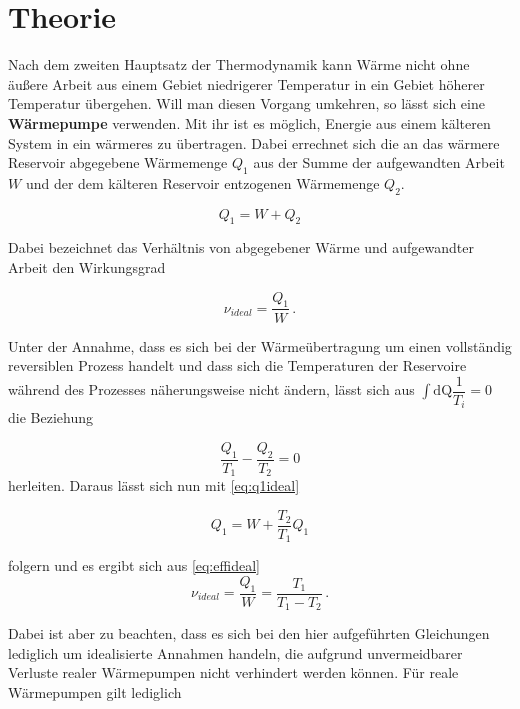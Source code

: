 \section{Theorie}
\label{sec:Theorie}
Nach dem zweiten Hauptsatz der Thermodynamik kann Wärme nicht ohne äußere Arbeit aus einem Gebiet niedrigerer Temperatur in ein Gebiet höherer Temperatur übergehen. Will man diesen Vorgang umkehren, so lässt sich
eine \textbf{Wärmepumpe} verwenden. Mit ihr ist es möglich, Energie aus einem kälteren System in ein wärmeres zu übertragen. Dabei errechnet sich die an das wärmere Reservoir abgegebene Wärmemenge $Q_1$ 
aus der Summe der aufgewandten Arbeit $W$ und der dem kälteren Reservoir entzogenen Wärmemenge $Q_2$.

\begin{equation}
    \label{eq:q1ideal}
    Q_1= W + Q_2
\end{equation}

Dabei bezeichnet das Verhältnis von abgegebener Wärme und aufgewandter Arbeit den Wirkungsgrad

\begin{equation}
    \label{eq:effideal}
    ν_{ideal} = \dfrac{Q_1}{W} \, \text{.}
\end{equation}

Unter der Annahme, dass es sich bei der Wärmeübertragung um einen vollständig reversiblen Prozess handelt und dass sich die Temperaturen der Reservoire während des Prozesses näherungsweise nicht ändern, lässt sich aus
$\int{\mathrm{dQ}\dfrac{1}{T_i}}=0$ die Beziehung

\begin{equation}
    \label{eq:rever}
    \dfrac{Q_1}{T_1} - \dfrac{Q_2}{T_2} = 0
\end{equation}
herleiten.
Daraus lässt sich nun mit \eqref{eq:q1ideal}

\begin{equation}
    Q_1 = W +\dfrac{T_2}{T_1}Q_1
\end{equation}
    
folgern und es ergibt sich aus \eqref{eq:effideal}
\begin{equation}
    ν_{ideal} = \dfrac{Q_1}{W} = \dfrac{T_1}{T_1-T_2} \, \text{.} \label{eq:effTdiff}
\end{equation}

\newpage

Dabei ist aber zu beachten, dass es sich bei den hier aufgeführten Gleichungen lediglich um idealisierte Annahmen handeln, die aufgrund unvermeidbarer Verluste realer Wärmepumpen nicht verhindert werden können.
Für reale Wärmepumpen gilt lediglich

